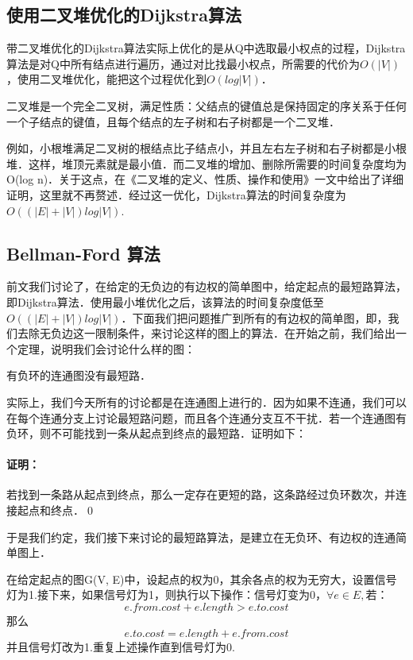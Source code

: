 \documentclass {article}
\begin{document}
\subsection {使用二叉堆优化的Dijkstra算法}
带二叉堆优化的Dijkstra算法实际上优化的是从Q中选取最小权点的过程，Dijkstra算法是对Q中所有结点进行遍历，通过对比找最小权点，所需要的代价为$O(|V|)$，使用二叉堆优化，能把这个过程优化到$O(log|V|)$．\cite {ref5}
\begin {define} 二叉堆是一个完全二叉树，满足性质：父结点的键值总是保持固定的序关系于任何一个子结点的键值，且每个结点的左子树和右子树都是一个二叉堆．\end {define}
例如，小根堆满足二叉树的根结点比子结点小，并且左右左子树和右子树都是小根堆．这样，堆顶元素就是最小值．而二叉堆的增加、删除所需要的时间复杂度均为O(log n)．关于这点，在《二叉堆的定义、性质、操作和使用》一文中给出了详细证明，\cite {ref6}这里就不再赘述．经过这一优化，Dijkstra算法的时间复杂度为$O((|E|+|V|)log|V|)$.\cite {ref4, ref5}

\subsection {Bellman-Ford 算法}
前文我们讨论了，在给定的无负边的有边权的简单图中，给定起点的最短路算法，即Dijkstra算法．使用最小堆优化之后，该算法的时间复杂度低至$O((|E|+|V|)log|V|)$．下面我们把问题推广到所有的有边权的简单图，即，我们去除无负边这一限制条件，来讨论这样的图上的算法．在开始之前，我们给出一个定理，说明我们会讨论什么样的图：
\begin {extra} 有负环的连通图没有最短路． \end {extra}
实际上，我们今天所有的讨论都是在连通图上进行的．因为如果不连通，我们可以在每个连通分支上讨论最短路问题，而且各个连通分支互不干扰．若一个连通图有负环，则不可能找到一条从起点到终点的最短路．证明如下：
\paragraph {证明：} 若找到一条路从起点到终点，那么一定存在更短的路，这条路经过负环数次，并连接起点和终点．\qed

于是我们约定，我们接下来讨论的最短路算法，是建立在无负环、有边权的连通简单图上．
\begin {theorm} 在给定起点的图G(V, E)中，设起点的权为0，其余各点的权为无穷大，设置信号灯为1.接下来，如果信号灯为1，则执行以下操作：信号灯变为0，$\forall e\in E, $若：$$ e.from.cost+e.length>e.to.cost $$那么$$ e.to.cost=e.length+e.from.cost $$并且信号灯改为1.重复上述操作直到信号灯为0.\cite {ref2} \end {theorm}
\end{document}
